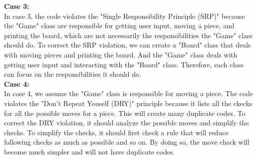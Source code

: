 \documentclass[11pt]{article}
\begin{document}
\noindent
\textbf{Case 3:}\\
In case 3, the code violates the "Single Responsibility Principle (SRP)" because the "Game" class are responsible for getting user input, moving a piece, and printing the board, which are not necessarily the responsibilities the "Game" class should do. To correct the SRP violation, we can create a "Board" class that deals with moving pieces and printing the board. And the "Game" class deals with getting user input and interacting with the "Board" class. Therefore, each class can focus on the responsibilities it should do.\\

\noindent
\textbf{Case 4:}\\
In case 4, we assume the "Game" class is responsible for moving a piece. The code violates the "Don't Repeat Youself (DRY)" principle because it lists all the ckecks for all the possible moves for a piece. This will create many duplicate codes. To correct the DRY violation, it should analyze the possible moves and simplify the checks. To simplify the checks, it should first check a rule that will reduce following checks as much as possible and so on. By doing so, the move check will become much simpler and will not have duplicate codes.
\end{document}
